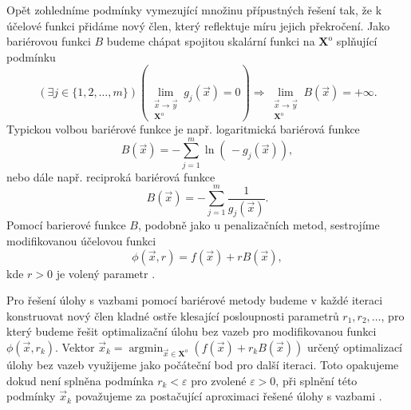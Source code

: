 Opět zohledníme podmínky vymezující množinu přípustných řešení tak, že k účelové funkci přidáme nový člen, který reflektuje míru jejich překročení. Jako bariérovou funkci $ B $ budeme chápat spojitou skalární funkci na $ \mathbf{X}^{\mathrm{o}} $ splňující podmínku
\begin{equation}
	(\exists j \in \{1,2,\dots,m\})(\lim\limits_{\substack{\vec{x} \to \vec{y} \\ \mathbf{X}^{\mathrm{o}}}} g_j (\vec{x}) = 0) \Rightarrow \lim\limits_{\substack{\vec{x} \to \vec{y} \\ \mathbf{X}^{\mathrm{o}}}} B (\vec{x}) = + \infty.
\end{equation}
Typickou volbou bariérové funkce je např. logaritmická bariérová funkce
\begin{equation}\label{eq:log barrier function}
B (\vec{x}) = -\sum_{j=1}^{m} \ln \left( \, - g_j (\vec{x}) \right),
\end{equation}
nebo dále např. reciproká bariérová funkce
\begin{equation}\label{eq:reciprocal barrier function}
B (\vec{x}) = -\sum_{j=1}^{m} \frac{1}{g_j (\vec{x})}.
\end{equation}
Pomocí barierové funkce $ B $, podobně jako u penalizačních metod, sestrojíme modifikovanou účelovou funkci 
\begin{equation}\label{eq:cost function with barrier}
\phi (\vec{x}, r) = f (\vec{x}) + r B(\vec{x}),
\end{equation}
kde $ r > 0 $ je volený parametr \cite{non-linear-textbook}.

Pro řešení úlohy s vazbami pomocí bariérové metody budeme v každé iteraci konstruovat nový člen kladné ostře klesající posloupnosti parametrů $ r_1, r_2, \dots$, pro který budeme řešit optimalizační úlohu bez vazeb pro modifikovanou funkci $ \phi (\vec{x}, r_k)$. Vektor $ \vec{x}_k  = \operatorname*{argmin}_{\vec{x} \in \mathbf{X}^\mathrm{o}} (f (\vec{x}) + r_k B(\vec{x}))$ určený optimalizací úlohy bez vazeb využijeme jako počáteční bod pro další iteraci. Toto opakujeme dokud není splněna podmínka $ r_k < \varepsilon$ pro zvolené $  \varepsilon > 0$, při splnění této podmínky $ \vec{x}_k $ považujeme za postačující aproximaci řešené úlohy s vazbami \cite{non-linear-textbook}.

